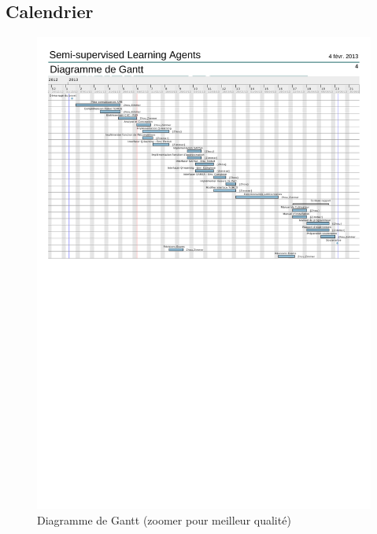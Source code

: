 \documentclass[a4paper,12pt]{article}
\begin{document}
    \subsection{Calendrier} 
      \begin{figure}[h!]
	\centerline{\includegraphics[width=20cm, clip=true, trim= 0 450 0 72]{../images/Gantt.pdf} }
	\caption{Diagramme de Gantt \scriptsize{(zoomer pour meilleur qualité)}}
      \end{figure}
\end{document}
